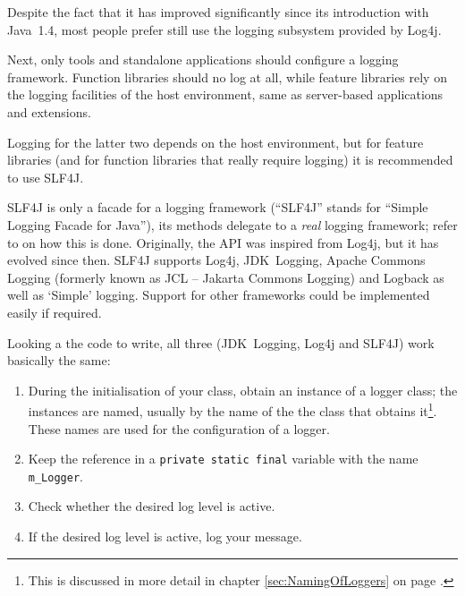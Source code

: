 \documentclass[11pt,a4paper, titlepage, parskip=half, headsepline, footsepline, cleardoublepage=current, headheight=1cm]{scrbook}
\newcommand*{\tqvref}[1]{\hyperref[{#1}]{\ref*{#1}} on page \pageref{#1}}
\begin{document}
Despite the fact that it has improved significantly since its introduction with Java~1.4, most people prefer still use the logging subsystem provided by Log4j\autocite{APACHE_LOG4J}.

Next, only tools and standalone applications should configure a logging framework. Function libraries should no log at all, while feature libraries rely on the logging facilities of the host environment, same as server-based applications and extensions.

Logging for the latter two depends on the host environment, but for feature libraries (and for function libraries that really require logging) it is recommended to use SLF4J\autocite{SLF4J}.

SLF4J is only a facade for a logging framework (“SLF4J” stands for “Simple Logging Facade for Java”), its methods delegate to a \textit{real} logging framework; refer to \autocite{SLF4J:Binding} on how this is done. Originally, the API was inspired from Log4j, but it has evolved since then. SLF4J supports Log4j, JDK~Logging, Apache Commons Logging\autocite{APACHE_COMMONS_LOGGING} (formerly known as JCL – Jakarta Commons Logging) and Logback\autocite{LOGBACK} as well as ‘Simple’ logging. Support for other frameworks could be implemented easily if required.

Looking a the code to write, all three (JDK~Logging, Log4j and SLF4J) work basically the same:
\begin{enumerate}[nosep]
\item{During the initialisation of your class, obtain an instance of a logger class; the instances are named, usually by the name of the the class that obtains it\footnote{This is discussed in more detail in chapter \tqvref{sec:NamingOfLoggers}.}. These names are used for the configuration of a logger.}
\item{Keep the reference in a \lstinline|private static final| variable with the name \lstinline|m_Logger|.}
\item{Check whether the desired log level is active.}
\item{If the desired log level is active, log your message.}
\end{enumerate}
\end{document}
